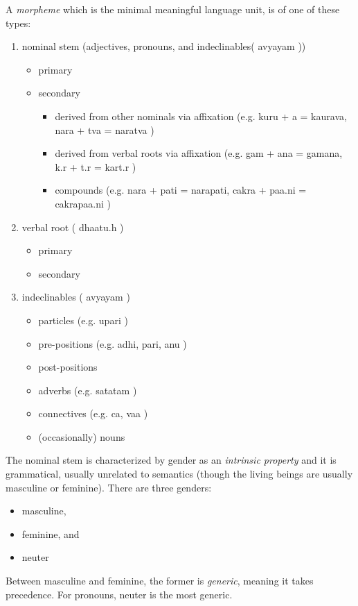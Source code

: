 \documentclass[a4paper, 12pt]{article}
\newcommand \sans[1]{
    \textsanskrit{#1}
}
\begin{document}
    A \emph{morpheme} which is the minimal meaningful language unit, is of one of these types:
    \begin{enumerate}
        \item nominal stem (adjectives, pronouns, and indeclinables(\sans{avyayam}))
            \begin{itemize}
                \item primary 
                \item secondary 
                    \begin{itemize}
                        \item derived from other nominals via affixation (e.g. \sans{kuru} + \sans{a = kaurava, nara} + \sans{tva = naratva})
                        \item derived from verbal roots via affixation (e.g. \sans{gam} + \sans{ana = gamana, k.r} + \sans{t.r = kart.r})
                        \item compounds (e.g. \sans{nara} + \sans{pati = narapati, cakra} + \sans{paa.ni = cakrapaa.ni})
                    \end{itemize}
            \end{itemize}
        \item verbal root (\sans{dhaatu.h})
            \begin{itemize}
                \item primary
                \item secondary
            \end{itemize}
        \item indeclinables (\sans{avyayam})
            \begin{itemize}
                \item particles (e.g. \sans{upari})
                \item pre-positions (e.g. \sans{adhi, pari, anu})
                \item post-positions
                \item adverbs (e.g. \sans{satatam})
                \item connectives (e.g. \sans{ca, vaa})
                \item (occasionally) nouns
            \end{itemize}
    \end{enumerate}

    The nominal stem is characterized by gender as an \emph{intrinsic property} and it is grammatical, usually unrelated to semantics (though the living beings are usually masculine or feminine). There are three genders:
    \begin{itemize}
        \item masculine,
        \item feminine, and
        \item neuter
    \end{itemize}
    Between masculine and feminine, the former is \emph{generic}, meaning it takes precedence. For pronouns, neuter is the most generic.
\end{document}
